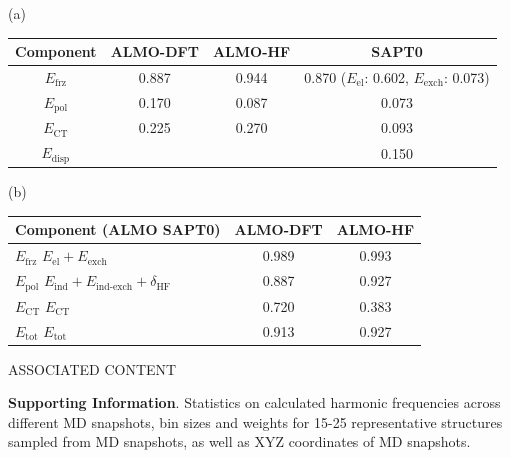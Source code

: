 \begin{table}
  \centering
  \caption{Correlation coefficients (\(R^2\)) between different solute-solvent interaction energy components as calculated at the ALMO-DFT (B3LYP), ALMO-HF, and SAPT0 level within the SP basis. (a) Comparison between individual components and the total interaction energy (\(E_{\text{tot}}\)) calculated for each methodology. (b) Correlation coefficients between contributions to the \textendash{}IL interaction energy calculated via ALMO as compared to the corresponding SAPT0 energy terms. Reported SAPT0 results are within the dimer-centered basis set (DCBS), except for the charge transfer component, which is calculated as the difference between monomer- and dimer-centered basis set results for the induction energy.}
  \label{paper_02:tab:7}

  (a)

  \begin{longtable}[]{@{}cccc@{}}
    \toprule
    Component & ALMO-DFT & ALMO-HF & SAPT0\tabularnewline
    \midrule
    \endhead
    \(E_{\text{frz}}\) & 0.887 & 0.944 & 0.870 (\(E_{\text{el}}\): 0.602, \(E_{\text{exch}}\): 0.073) \tabularnewline
    \(E_{\text{pol}}\) & 0.170 & 0.087 & 0.073\tabularnewline
    \(E_{\text{CT}}\) & 0.225 & 0.270 & 0.093\tabularnewline
    \(E_{\text{disp}}\) & \textemdash{} & \textemdash{} & 0.150\tabularnewline
    \bottomrule
  \end{longtable}

  (b)

  \begin{longtable}[]{@{}lcc@{}}
    \toprule
    Component (ALMO \textemdash{} SAPT0) & ALMO-DFT & ALMO-HF\tabularnewline
    \midrule
    \endhead
    \(E_{\text{frz}}\) \textemdash{} \(E_{\text{el}} + E_{\text{exch}}\) & 0.989 & 0.993\tabularnewline
    \(E_{\text{pol}}\) \textemdash{} \(E_{\text{ind}} + E_{\text{ind-exch}} + \delta_{\text{HF}}\) & 0.887 & 0.927\tabularnewline
    \(E_{\text{CT}}\) \textemdash{} \(E_{\text{CT}}\) & 0.720 & 0.383\tabularnewline
    \(E_{\text{tot}}\) \textemdash{} \(E_{\text{tot}}\) & 0.913 & 0.927\tabularnewline
    \bottomrule
  \end{longtable}
\end{table}

ASSOCIATED CONTENT

\textbf{Supporting Information}. Statistics on calculated harmonic frequencies across different MD snapshots, bin sizes and weights for 15-25 representative structures sampled from MD snapshots, as well as XYZ coordinates of MD snapshots.

